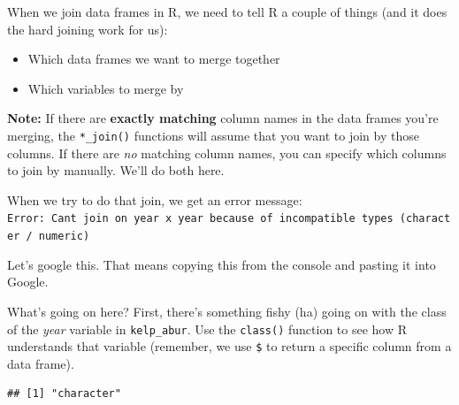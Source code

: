 \documentclass[]{book}
\newenvironment{Shaded}{\begin{snugshade}}{\end{snugshade}}
\newcommand{\CommentTok}[1]{\textcolor[rgb]{0.56,0.35,0.01}{\textit{#1}}}
\newcommand{\DataTypeTok}[1]{\textcolor[rgb]{0.13,0.29,0.53}{#1}}
\newcommand{\DecValTok}[1]{\textcolor[rgb]{0.00,0.00,0.81}{#1}}
\newcommand{\KeywordTok}[1]{\textcolor[rgb]{0.13,0.29,0.53}{\textbf{#1}}}
\newcommand{\NormalTok}[1]{#1}
\newcommand{\OperatorTok}[1]{\textcolor[rgb]{0.81,0.36,0.00}{\textbf{#1}}}
\newcommand{\StringTok}[1]{\textcolor[rgb]{0.31,0.60,0.02}{#1}}
\providecommand{\tightlist}{%
  \setlength{\itemsep}{0pt}\setlength{\parskip}{0pt}}
\begin{document}
When we join data frames in R, we need to tell R a couple of things (and it does the hard joining work for us):

\begin{itemize}
\tightlist
\item
  Which data frames we want to merge together
\item
  Which variables to merge by
\end{itemize}

\textbf{Note:} If there are \textbf{exactly matching} column names in the data frames you're merging, the \texttt{*\_join()} functions will assume that you want to join by those columns. If there are \emph{no} matching column names, you can specify which columns to join by manually. We'll do both here.

\begin{Shaded}
\end{Shaded}

When we try to do that join, we get an error message:
\texttt{Error:\ Can\textquotesingle{}t\ join\ on\ \textquotesingle{}year\textquotesingle{}\ x\ \textquotesingle{}year\textquotesingle{}\ because\ of\ incompatible\ types\ (character\ /\ numeric)}

Let's google this. That means copying this from the console and pasting it into Google.

What's going on here? First, there's something fishy (ha) going on with the class of the \emph{year} variable in \texttt{kelp\_abur}. Use the \texttt{class()} function to see how R understands that variable (remember, we use \texttt{\$} to return a specific column from a data frame).

\begin{Shaded}
\end{Shaded}

\begin{verbatim}
## [1] "character"
\end{verbatim}
\end{document}
